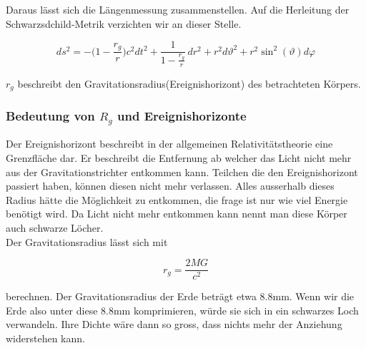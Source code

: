 \begin{refsection}
	Daraus lässt sich die Längenmessung zusammenstellen. Auf die Herleitung der Schwarzsdchild-Metrik verzichten wir an dieser Stelle.

	\begin{equation}
	ds^2
	=
	-\biggl(1-\frac{r_g}r\biggr)c^2dt^2
	+
	\frac{1}{\displaystyle 1-\frac{r_g}r}\,dr^2 
	+
	r^2d\vartheta^2 
	+ 
	r^2\sin^2(\vartheta)d\varphi
	\end{equation}

	$r_g$ beschreibt den Gravitationsradius(Ereignishorizont) des betrachteten Körpers.

	\subsubsection{Bedeutung von $R_{g}$ und Ereignishorizonte}


	Der Ereignishorizont beschreibt in der allgemeinen Relativitätstheorie eine Grenzfläche dar. Er beschreibt die Entfernung ab welcher das Licht nicht mehr aus der Gravitationstrichter entkommen kann. Teilchen die den Ereignishorizont passiert haben, können diesen nicht mehr verlassen. Alles ausserhalb dieses Radius hätte die Möglichkeit zu entkommen, die frage ist nur wie viel Energie benötigt wird. Da Licht nicht mehr entkommen kann nennt man diese Körper auch schwarze Löcher.\\
	Der Gravitationsradius lässt sich mit 

	\begin{equation}
	r_{g}= \frac{2MG}{c^2}
	\end{equation}

	berechnen.
	Der Gravitationsradius der Erde beträgt etwa 8.8mm. Wenn wir die Erde also unter  diese 8.8mm komprimieren, würde sie sich in ein schwarzes Loch verwandeln. Ihre Dichte wäre dann so gross, dass nichts mehr der Anziehung widerstehen kann.




	\printbibliography[heading=subbibliography]
	\end{refsection}

